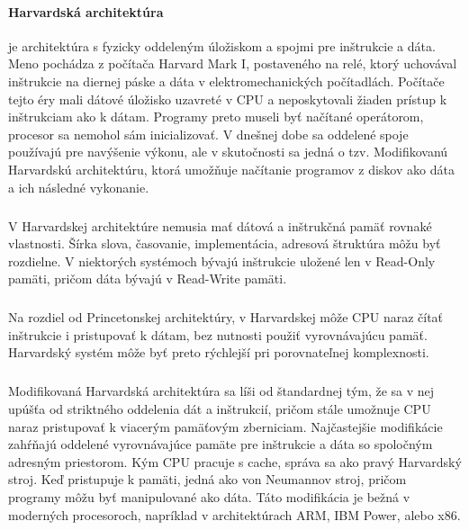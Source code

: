 \documentclass[11pt,a4paper]{report}
\begin{document}
\paragraph{Harvardská architektúra} je architektúra s fyzicky oddeleným úložiskom a spojmi pre inštrukcie a dáta. Meno pochádza z počítača Harvard Mark I, postaveného na relé, ktorý uchovával inštrukcie na diernej páske a dáta v elektromechanických počítadlách. Počítače tejto éry mali dátové úložisko uzavreté v CPU a neposkytovali žiaden prístup k inštrukciam ako k dátam. Programy preto museli byť načítané operátorom, procesor sa nemohol sám inicializovať. V dnešnej dobe sa oddelené spoje používajú pre navýšenie výkonu, ale v skutočnosti sa jedná o tzv. Modifikovanú Harvardskú architektúru, ktorá umožňuje načítanie programov z diskov ako dáta a ich následné vykonanie.

\subparagraph{}V Harvardskej architektúre nemusia mať dátová a inštrukčná pamäť rovnaké vlastnosti. Šírka slova, časovanie, implementácia, adresová štruktúra môžu byť rozdielne. V niektorých systémoch bývajú inštrukcie uložené len v Read-Only pamäti, pričom dáta bývajú v Read-Write pamäti. 

\subparagraph{}Na rozdiel od Princetonskej architektúry, v Harvardskej môže CPU naraz čítať inštrukcie i pristupovať k dátam, bez nutnosti použiť vyrovnávajúcu pamäť. Harvardský systém môže byť preto rýchlejší pri porovnateľnej komplexnosti.

\subparagraph{}Modifikovaná Harvardská architektúra sa líši od štandardnej tým, že sa v nej upúšťa od striktného oddelenia dát a inštrukcií, pričom stále umožnuje CPU naraz pristupovať k viacerým pamäťovým zberniciam. Najčastejšie modifikácie zahŕňajú oddelené vyrovnávajúce pamäte pre inštrukcie a dáta so spoločným adresným priestorom. Kým CPU pracuje s cache, správa sa ako pravý Harvardský stroj. Keď pristupuje k pamäti, jedná ako von Neumannov stroj, pričom programy môžu byť manipulované ako dáta. Táto modifikácia je bežná v moderných procesoroch, napríklad v architektúrach ARM, IBM Power, alebo x86.
\end{document}
